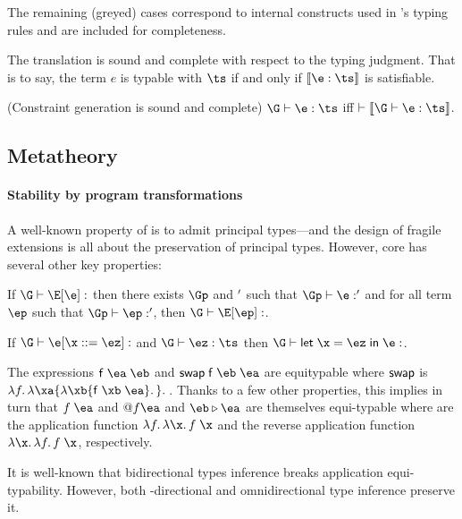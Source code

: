 \documentclass[acmsmall,screen,nonacm]{acmart}
\begin{document}
The remaining (greyed) cases  correspond to internal
constructs used in \OML's typing rules and are included for completeness.


The translation is sound and complete with respect to the typing judgment.
That is to say, the term $e$ is typable with $\ts$ if and only if
$\cinfer \e \ts$ is satisfiable.
%
\begin{theorem}{(Constraint generation is sound and complete)}
$\G \th \e : \ts$ iff\/
$\th \csem {\G \th \e : \ts}$.
\end{theorem}

\subsection{Metatheory}
\label{sec:constraint-prop}


\paragraph{Stability by program transformations}

A well-known property of \ML is to admit principal types---and the design of
fragile \ML extensions is all about the preservation of principal types.
However, core \ML has several other key properties:
\begin{description}[font=\it,align=mydesc,topsep=1ex,itemsep=1ex,leftmargin=0ex]
\newcommand {\eswap}{\mathprefix  {swap}}

\item [Compositionality]
  If $\G \th \E \where \e : \t$ then there exists $\Gp$ and $\relax'$ such that
  $\Gp \th \e : \tp$ and for all term $\ep$ such that $\Gp \th \ep : \tp$,
  then $\G \th \E \where \ep : \t$.

\item [Factorization]
  If $\G \th \e \where {\x \is \ez} : \t$ and $\G \th \ez : \ts$ then
  $\G \th \elet \x \ez \e : \t$.


\item [Application equitypability]
  The expressions $\eappp f \ea \eb$ and $\eappp {\eswap f} \eb \ea$ are
  equitypable where $\eswap$ is $\efun f {\efun \xa {\efun \xb {\eappp f \xb
  \ea}}}$.  Thanks to a few other properties, this implies in turn that
  $\eapp f \ea$ and $\eApp f \ea$ and $\eb \ePipe \ea$ are themselves
  equi-typable where are the application function $\efun f \efun \x \eapp f
  \x$ and the reverse application function $\efun \x \efun f \eapp f \x$,
  respectively.

\end{description}
It is well-known that bidirectional types inference breaks application
equi-typability. However, both \Geninst-directional and omnidirectional type
inference preserve it.
\end{document}
